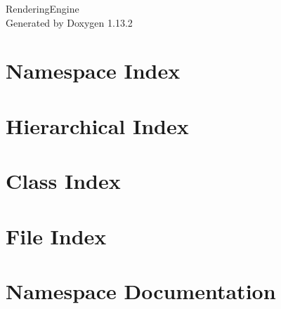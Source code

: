 \documentclass[twoside]{book}
\newcommand{\+}{\discretionary{\mbox{\scriptsize$\hookleftarrow$}}{}{}}
\newcommand{\clearemptydoublepage}{%
    \newpage{\pagestyle{empty}\cleardoublepage}%
  }
\begin{document}
  \raggedbottom
    \hypersetup{pageanchor=false,
                bookmarksnumbered=true,
                pdfencoding=unicode
               }
  \begin{titlepage}
  \vspace*{7cm}
  \begin{center}%
  {\Large Rendering\+Engine}\\
  \vspace*{1cm}
  {\large Generated by Doxygen 1.13.2}\\
  \end{center}
  \end{titlepage}
  \clearemptydoublepage
  \tableofcontents
  \clearemptydoublepage
  \hypersetup{pageanchor=true}
\chapter{Namespace Index}

\chapter{Hierarchical Index}

\chapter{Class Index}

\chapter{File Index}

\chapter{Namespace Documentation}

\end{document}
